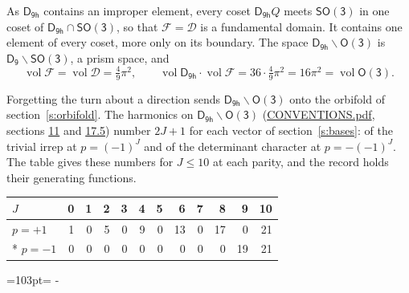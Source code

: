 \documentclass[10pt,a4paper]{article}
\newcommand{\needspace}[1]{\par\penalty-100\begingroup\dimen0=#1\relax\dimen2=\pagegoal
  \advance\dimen2-\pagetotal\ifdim\dimen0>\dimen2\relax\ifdim\dimen2>0pt\vfil\break\fi\fi
  \endgroup}
\numberwithin{equation}{section}
\newcommand{\grp}[1]{\mathsf{#1}}
\newcommand{\vol}{\operatorname{vol}}
\newcommand{\fcell}{\mathcal{D}}
\newcommand{\fdomain}{\mathcal{F}}
\begin{document}
\leavevmode\label{n:set.fundamental}As $\grp{D_{9h}}$ contains an improper element, every coset $\grp{D_{9h}}Q$ meets \href{SO3.pdf}{$\grp{SO(3)}$} in one coset of $\grp{D_{9h}} \cap \grp{SO(3)}$, so that $\fdomain = \fcell$ is a fundamental domain. It contains one element of every coset, more only on its boundary.
The space $\grp{D_{9h}}\backslash\grp{O(3)}$ is $\grp{D_{9}}\backslash\grp{SO(3)}$, a prism space, and
\begin{equation}\label{e:volume}\vol\fdomain = \vol\fcell = \tfrac{4}{9}\pi^2,\qquad \vol\grp{D_{9h}}\cdot\vol\fdomain = 36\cdot \tfrac{4}{9}\pi^2 = 16\pi^2 = \vol\grp{O(3)}.\end{equation}

Forgetting the turn about a direction sends $\grp{D_{9h}}\backslash\grp{O(3)}$ onto the orbifold of section~\ref{s:orbifold}.
The harmonics on $\grp{D_{9h}}\backslash\grp{O(3)}$ (\href{../../CONVENTIONS.pdf}{CONVENTIONS.pdf}, sections \href{../../CONVENTIONS.pdf\#conv.11}{11} and \href{../../CONVENTIONS.pdf\#conv.17.5}{17.5}) number $2J + 1$ for each vector of section~\ref{s:bases}: of the trivial irrep at $p = (-1)^J$ and of the determinant character at $p = -(-1)^J$. The table gives these numbers for $J \le 10$ at each parity, and the record holds their generating functions.
{\small\setlength{\tabcolsep}{4pt}\begin{longtable}{@{}lrrrrrrrrrrr@{}}\toprule
$J$ & 0 & 1 & 2 & 3 & 4 & 5 & 6 & 7 & 8 & 9 & 10\\\midrule\endhead
\bottomrule\endfoot\endlastfoot
$p = +1$ & 1 & 0 & 5 & 0 & 9 & 0 & 13 & 0 & 17 & 0 & 21\\*
$p = -1$ & 0 & 0 & 0 & 0 & 0 & 0 & 0 & 0 & 0 & 19 & 21\\
\bottomrule\end{longtable}}
\needspace{103pt}
\end{document}

